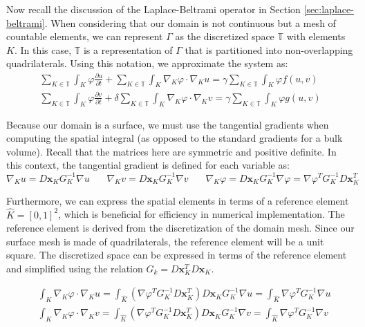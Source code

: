 \documentclass[12pt]{article}
\begin{document}
Now recall the discussion of the Laplace-Beltrami operator in Section \ref{sec:laplace-beltrami}. When considering that our domain is not continuous but a mesh of countable elements, we can represent $\Gamma$ as the discretized space $\mathbb{T}$ with elements $K$. In this case, $\mathbb{T}$ is a representation of $\Gamma$ that is partitioned into non-overlapping quadrilaterals. Using this notation, we approximate the system as:
\begin{equation}
\begin{aligned}
\sum_{K\in\mathbb{T}} 
\int_K \varphi\frac{\partial u}{\partial t} + 
\sum_{K\in\mathbb{T}}
\int_K \nabla_K\varphi\cdot\nabla_K u = 
\gamma\sum_{K\in\mathbb{T}}
\int_K \varphi f(u,v) \\
\sum_{K\in\mathbb{T}}
\int_K \varphi\frac{\partial v}{\partial t} + 
\delta\sum_{K\in\mathbb{T}}
\int_K \nabla_K\varphi\cdot\nabla_K v =
\gamma\sum_{K\in\mathbb{T}}
\int_K \varphi g(u,v)
\end{aligned}
\end{equation}

Because our domain is a surface, we must use the tangential gradients when computing the spatial integral (as opposed to the standard gradients for a bulk volume). Recall that the matrices here are symmetric and positive definite. In this context, the tangential gradient is defined for each variable as:
$$\nabla_K u = D\textbf{x}_K G^{-1}_K\nabla u	~~~~~~~~
\nabla_K v = D\textbf{x}_K G^{-1}_K\nabla v ~~~~~~~~ 
\nabla_K \varphi = D\textbf{x}_K G^{-1}_K\nabla \varphi = \nabla \varphi^T G^{-1}_K D\textbf{x}_K^T$$

Furthermore, we can express the spatial elements in terms of a  reference element $\hat{K} = [0,1]^2$, which is beneficial for efficiency in numerical implementation. The reference element is derived from the discretization of the domain mesh. Since our surface mesh is made of quadrilaterals, the reference element will be a unit square. The discretized space can be expressed in terms of the reference element and simplified using the relation $G_k = D\textbf{x}_K^T D\textbf{x}_K$.


\begin{equation}\label{eq:tanint}
\begin{aligned}
&\int_K \nabla_K\varphi\cdot\nabla_K u = \int_{\hat{K}}   \left(\nabla \varphi^T G^{-1}_K D\textbf{x}_K^T\right) D\textbf{x}_K G^{-1}_K\nabla u = \int_{\hat{K}}  \nabla \varphi^T G^{-1}_K  \nabla u   \\
&\int_K \nabla_K\varphi\cdot\nabla_K v = \int_{\hat{K}}  \left(\nabla \varphi^T G^{-1}_K D\textbf{x}_K^T\right) D\textbf{x}_K G^{-1}_K\nabla v = \int_{\hat{K}}  \nabla \varphi^T G^{-1}_K  \nabla v 
\end{aligned}
\end{equation}
\end{document}
